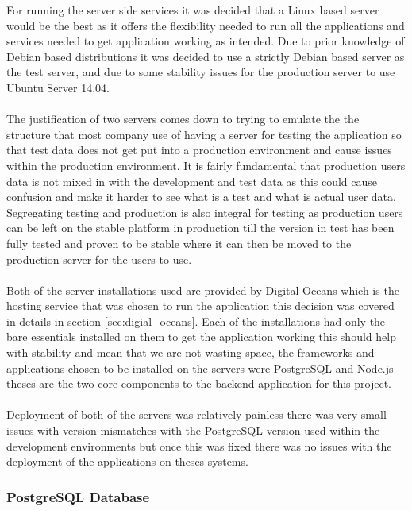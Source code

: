 For running the server side services it was decided that a Linux based server would be the best as it offers the flexibility needed to run all the applications and services needed to get application working as intended. Due to prior knowledge of Debian based distributions it was decided to use a strictly Debian based server as the test server, and due to some stability issues for the production server to use Ubuntu Server 14.04.\\
\\
The justification of two servers comes down to trying to emulate the the structure that most company use of having a server for testing the application so that test data does not get put into a production environment and cause issues within the production environment. It is fairly fundamental that production users data is not mixed in with the development and test data as this could cause confusion and make it harder to see what is a test and what is actual user data. Segregating testing and production is also integral for testing as production users can be left on the stable platform in production till the version in test has been fully tested and proven to be stable where it can then be moved to the production server for the users to use.\\
\\
Both of the server installations used are provided by Digital Oceans which is the hosting service that was chosen to run the application this decision was covered in details in section \ref{sec:digial_oceans}. Each of the installations had only the bare essentials installed on them to get the application working this should help with stability and mean that we are not wasting space, the frameworks and applications chosen to be installed on the servers were PostgreSQL and Node.js theses are the two core components to the backend application for this project.\\
\\
Deployment of both of the servers was relatively painless there was very small issues with version mismatches with the PostgreSQL version used within the development environments but once this was fixed there was no issues with the deployment of the applications on theses systems.

\subsubsection{PostgreSQL Database}


